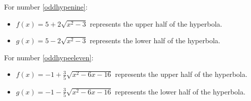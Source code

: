 \begin{enumerate}
For number \ref{oddhypenine}:

\begin{itemize}

\item  $f(x) = 5+2 \sqrt{x^2-3}$ represents the upper half of the hyperbola.

\item  $g(x) = 5-2 \sqrt{x^2-3}$ represents the lower half of the hyperbola.

\end{itemize}

For number \ref{oddhypeeleven}:

\begin{itemize}

\item  $f(x) = -1+ \frac{3}{5} \sqrt{x^2-6x-16}$ represents the upper half of the hyperbola.

\item  $g(x) = -1- \frac{3}{5} \sqrt{x^2-6x-16} $ represents the lower half of the hyperbola.

\end{itemize}


\setcounter{HW}{\value{enumi}}
\end{enumerate}

